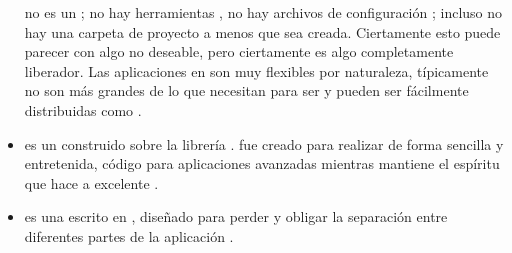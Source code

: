 \begin{itemize}
				\sinatraNAME no es un \frameworkPC; no hay herramientas \builtINPL \ormAS, no hay archivos de configuración \preFabCPT; incluso no hay una carpeta de proyecto a menos que sea creada. Ciertamente esto puede parecer con algo no deseable, pero ciertamente es algo completamente liberador. Las aplicaciones en \sinatraNAME son muy flexibles por naturaleza, típicamente no son más grandes de lo que necesitan para ser y pueden ser fácilmente distribuidas como \rubyGemsAS  \cite{book_sinatra_oreilly}.



			\item
				\textbf{\padrinoNAME} es un \frameworkPC construido sobre la librería \webINT \sinatraNAME.  \padrinoNAME fue creado para realizar de forma sencilla y entretenida, código para aplicaciones \webINT avanzadas mientras mantiene el espíritu que hace a \sinatraNAME excelente \cite{online_technology_padrino_officialsite}.

			
			\item
				\textbf{\djangoNAME} es una \frameworkPC \openSourcePC escrito en \pythonNAME, diseñado para perder \couplingAS y obligar la separación entre diferentes partes de la aplicación \cite{online_book_django_developmentpattern}.



\end{itemize}
